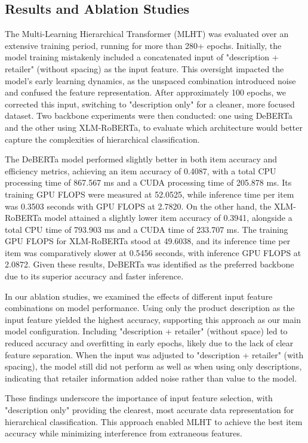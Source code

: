 \documentclass[9pt,a4paper,twoside]{rho-class/rho}
\begin{document}
    \subsection{Results and Ablation Studies}

       The Multi-Learning Hierarchical Transformer (MLHT) was evaluated over an extensive training period, running for more than 280+ epochs. Initially, the model training mistakenly included a concatenated input of "description + retailer" (without spacing) as the input feature. This oversight impacted the model's early learning dynamics, as the unspaced combination introduced noise and confused the feature representation. After approximately 100 epochs, we corrected this input, switching to "description only" for a cleaner, more focused dataset. Two backbone experiments were then conducted: one using DeBERTa and the other using XLM-RoBERTa, to evaluate which architecture would better capture the complexities of hierarchical classification.

        The DeBERTa model performed slightly better in both item accuracy and efficiency metrics, achieving an item accuracy of 0.4087, with a total CPU processing time of 867.567 ms and a CUDA processing time of 205.878 ms. Its training GPU FLOPS were measured at 52.0525, while inference time per item was 0.3503 seconds with GPU FLOPS at 2.7820. On the other hand, the XLM-RoBERTa model attained a slightly lower item accuracy of 0.3941, alongside a total CPU time of 793.903 ms and a CUDA time of 233.707 ms. The training GPU FLOPS for XLM-RoBERTa stood at 49.6038, and its inference time per item was comparatively slower at 0.5456 seconds, with inference GPU FLOPS at 2.0872. Given these results, DeBERTa was identified as the preferred backbone due to its superior accuracy and faster inference.
        
        In our ablation studies, we examined the effects of different input feature combinations on model performance. Using only the product description as the input feature yielded the highest accuracy, supporting this approach as our main model configuration. Including "description + retailer" (without space) led to reduced accuracy and overfitting in early epochs, likely due to the lack of clear feature separation. When the input was adjusted to "description + retailer" (with spacing), the model still did not perform as well as when using only descriptions, indicating that retailer information added noise rather than value to the model.
        
        These findings underscore the importance of input feature selection, with "description only" providing the clearest, most accurate data representation for hierarchical classification. This approach enabled MLHT to achieve the best item accuracy while minimizing interference from extraneous features.
\end{document}
